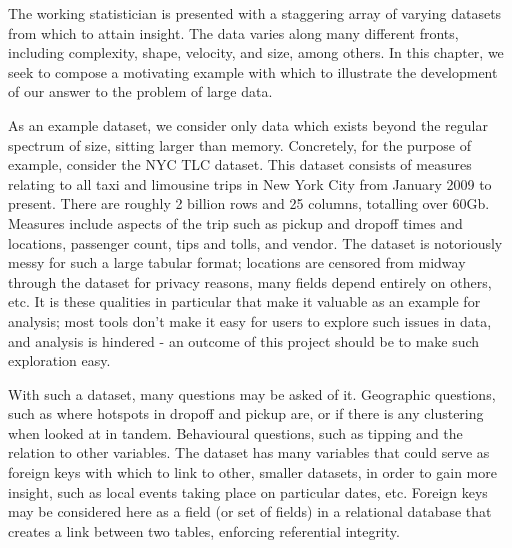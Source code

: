 The working statistician is presented with a staggering array of varying datasets from which to attain insight.
The data varies along many different fronts, including complexity, shape, velocity, and size, among others.
In this chapter, we seek to compose a motivating example with which to illustrate the development of our answer to the problem of large data.

As an example dataset, we consider only data which exists beyond the regular spectrum of size, sitting larger than memory.
Concretely, for the purpose of example, consider the NYC TLC dataset\cite{tlc2021trips}.
This dataset consists of measures relating to all taxi and limousine trips in New York City from January 2009 to present.
There are roughly 2 billion rows and 25 columns, totalling over 60Gb.
Measures include aspects of the trip such as pickup and dropoff times and locations, passenger count, tips and tolls, and vendor.
The dataset is notoriously messy for such a large tabular format; locations are censored from midway through the dataset for privacy reasons, many fields depend entirely on others, etc. It is these qualities in particular that make it valuable as an example for analysis; most tools don't make it easy for users to explore such issues in data, and analysis is hindered - an outcome of this project should be to make such exploration easy.

With such a dataset, many questions may be asked of it.
Geographic questions, such as where hotspots in dropoff and pickup are, or if there is any clustering when looked at in tandem.
Behavioural questions, such as tipping and the relation to other variables.
The dataset has many variables that could serve as foreign keys with which to link to other, smaller datasets, in order to gain more insight, such as local events taking place on particular dates, etc.
Foreign keys may be considered here as a field (or set of fields) in a relational database that creates a link between two tables, enforcing referential integrity.

